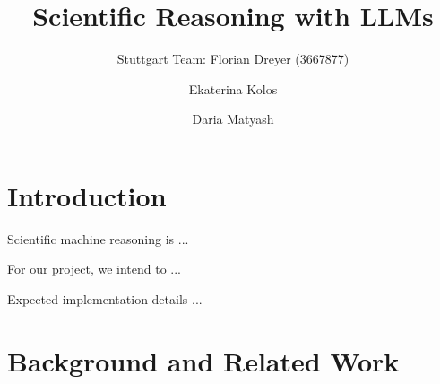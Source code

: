 \documentclass{article}
\begin{document}
\title{Scientific Reasoning with LLMs}

\author{Stuttgart Team: Florian Dreyer (3667877) \and Ekaterina Kolos \and Daria Matyash}

\maketitle             


\section{Introduction}

Scientific machine reasoning is ... 

For our project, we intend to ...

Expected implementation details ...

\section{Background and Related Work}
\end{document}
